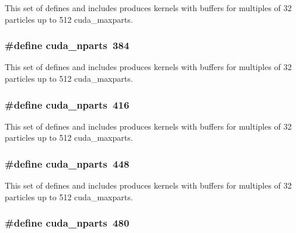 This set of defines and includes produces kernels with buffers for multiples of 32 particles up to 512 cuda\-\_\-maxparts. \hypertarget{runner__cuda_8cu_a73a9582f0db5b61423deb6c2e5ade9e8}{
\subsubsection[{cuda\-\_\-nparts}]{\setlength{\rightskip}{0pt plus 5cm}\#define cuda\-\_\-nparts~384}}\label{runner__cuda_8cu_a73a9582f0db5b61423deb6c2e5ade9e8}
This set of defines and includes produces kernels with buffers for multiples of 32 particles up to 512 cuda\-\_\-maxparts. \hypertarget{runner__cuda_8cu_a73a9582f0db5b61423deb6c2e5ade9e8}{
\subsubsection[{cuda\-\_\-nparts}]{\setlength{\rightskip}{0pt plus 5cm}\#define cuda\-\_\-nparts~416}}\label{runner__cuda_8cu_a73a9582f0db5b61423deb6c2e5ade9e8}
This set of defines and includes produces kernels with buffers for multiples of 32 particles up to 512 cuda\-\_\-maxparts. \hypertarget{runner__cuda_8cu_a73a9582f0db5b61423deb6c2e5ade9e8}{
\subsubsection[{cuda\-\_\-nparts}]{\setlength{\rightskip}{0pt plus 5cm}\#define cuda\-\_\-nparts~448}}\label{runner__cuda_8cu_a73a9582f0db5b61423deb6c2e5ade9e8}
This set of defines and includes produces kernels with buffers for multiples of 32 particles up to 512 cuda\-\_\-maxparts. \hypertarget{runner__cuda_8cu_a73a9582f0db5b61423deb6c2e5ade9e8}{
\subsubsection[{cuda\-\_\-nparts}]{\setlength{\rightskip}{0pt plus 5cm}\#define cuda\-\_\-nparts~480}}\label{runner__cuda_8cu_a73a9582f0db5b61423deb6c2e5ade9e8}

